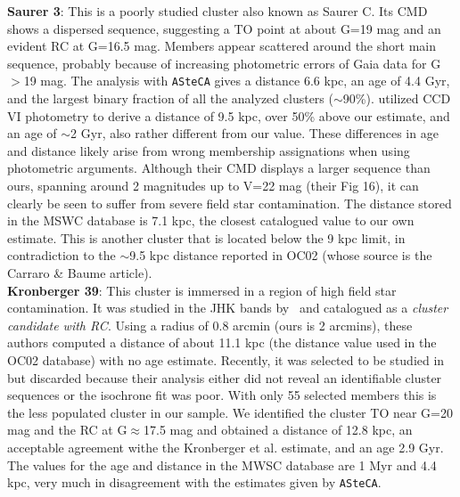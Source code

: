 \documentclass{aa}
\begin{document}
  \textbf{Saurer 3}: This is a poorly studied cluster also known as Saurer C.
  Its CMD shows a dispersed sequence, suggesting a TO point at about G=19 mag
  and an evident RC at G=16.5 mag. Members appear scattered around the short
  main sequence, probably because of increasing photometric errors of Gaia data
  for G$>$19 mag.
  The analysis with \texttt{ASteCA} gives a distance 6.6 kpc, an age of 4.4
  Gyr, and the largest binary fraction of all the analyzed clusters 
  ($\sim$90\%).
  \cite{Carraro_2003} utilized CCD VI photometry to derive a distance of 9.5
  kpc, over 50\% above our estimate, and an age of $\sim$2 Gyr, also rather
  different from our value. These differences in age and distance likely
  arise from wrong membership assignations when using photometric
  arguments. Although their CMD displays a larger sequence than
  ours, spanning around 2 magnitudes up to V=22 mag (their Fig 16), it can
  clearly be seen to suffer from severe field star contamination.
  The distance stored in the MSWC database is 7.1 kpc, the closest catalogued
  value to our own estimate. This is another cluster that is located below the 9
  kpc limit, in contradiction to the $\sim$9.5 kpc distance reported in
  OC02 (whose source is the Carraro \& Baume article).\\

  \textbf{Kronberger 39}: This cluster is immersed in a region of high field
  star contamination. It was studied in the JHK bands by~\cite{Kronberger_2006}
  and catalogued as a \emph{cluster candidate with RC}. Using a radius of 0.8
  arcmin (ours is 2 arcmins), these authors computed a distance of about 11.1
  kpc (the distance value used in the OC02 database) with no age estimate.
  Recently, it was selected to be studied in~\cite{Monteiro_2020} but
  discarded because their analysis either did not reveal an identifiable cluster
  sequences or the isochrone fit was poor.
  With only 55 selected members this is the less populated cluster in our
  sample. We identified the cluster TO near G=20 mag and the RC at
  G$\approx$17.5 mag and obtained a distance of 12.8 kpc, an acceptable
  agreement withe the Kronberger et al. estimate, and an age 2.9 Gyr.
  The values for the age and distance in the MWSC database are 1 Myr and 4.4
  kpc, very much in disagreement with the estimates given by \texttt{ASteCA}.\\
\end{document}
